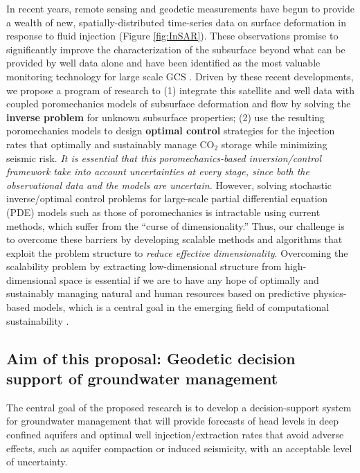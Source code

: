 \documentclass[11pt,final]{article}%
\def\CO2{CO$_2$}
\begin{document}
In recent years, remote sensing and geodetic measurements have begun to provide a wealth of new, spatially-distributed time-series data on surface deformation in response to fluid injection (Figure \ref{fig:InSAR}). These observations promise to significantly improve
the characterization of the subsurface beyond what can be provided by
well data alone and have been identified as the most valuable monitoring technology for large scale GCS \cite{Mathieson2010}.
Driven  by these recent developments, we propose a program of
research to 
(1) integrate this satellite and well data with coupled poromechanics
models of subsurface deformation and flow by solving the {\bf inverse
  problem} for unknown subsurface properties; (2) use the resulting
poromechanics models to design {\bf optimal control} strategies for
the injection rates that optimally and sustainably manage \CO2
storage while minimizing seismic risk. {\em It is essential that this poromechanics-based
  inversion/control framework take into account uncertainties at every
  stage, since both the observational data and the models are
  uncertain.} However, solving stochastic inverse/optimal control
problems for large-scale partial differential equation (PDE) models
such as those of poromechanics is intractable using current methods,
which suffer from the ``curse of dimensionality.''  Thus, our
challenge is to overcome these barriers by developing scalable methods
and algorithms that exploit the problem structure to {\em reduce
  effective dimensionality}. Overcoming the scalability problem by
extracting low-dimensional structure from high-dimensional space is
essential if we are to have any hope of optimally and sustainably
managing natural and human resources based on predictive physics-based
models, which is a central goal in the emerging field of computational
sustainability \cite{MillettEstrin12}.


\subsection{Aim of this proposal: Geodetic decision support of groundwater management}



The central goal of the proposed research is to develop a decision-support system for groundwater management that will provide forecasts of head levels in deep confined aquifers and optimal well injection/extraction rates that avoid adverse effects, such as aquifer compaction or induced seismicity, with an acceptable level of uncertainty. 
\end{document}
